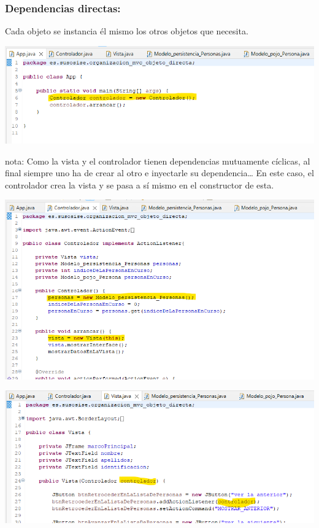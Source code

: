 \documentclass[spanish,12pt,a4paper,final,oneside]{book}
\begin{document}
\subsubsection*{Dependencias directas:}
Cada objeto se instancia él mismo los otros objetos que necesita.

\includegraphics[width=\textwidth]{MVC_directa_App} 

\begin{footnotesize}
nota: Como la vista y el controlador tienen dependencias mutuamente cíclicas, al final siempre uno ha de crear al otro e inyectarle su dependencia…
En este caso, el controlador crea la vista y se pasa a sí mismo en el constructor de esta.
\end{footnotesize}

\includegraphics[width=\textwidth]{MVC_directa_Controlador} 

\includegraphics[width=\textwidth]{MVC_directa_Vista} 
\end{document}
